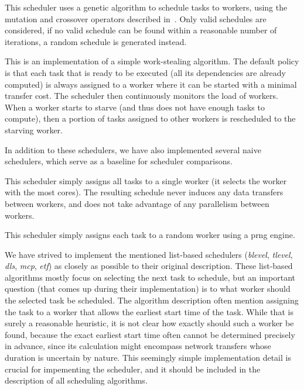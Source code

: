 \begin{description}[wide=0pt]
	\item[genetic]
		This scheduler uses a genetic algorithm to schedule tasks to workers, using the mutation and
		crossover operators described in~\cite{omara2009genetic}. Only valid schedules are considered, if no
		valid schedule can be found within a reasonable number of iterations, a random schedule is
		generated instead.

	\item[ws]
		This is an implementation of a simple work-stealing algorithm. The default policy is that each task
		that is ready to be executed (all its dependencies are already computed) is always assigned to a
		worker where it can be started with a minimal transfer cost. The scheduler then continuously
		monitors the load of workers. When a worker starts to starve (and thus does not have enough tasks
		to compute), then a portion of tasks assigned to other workers is rescheduled to the starving
		worker.
\end{description}

In addition to these schedulers, we have also implemented several naive schedulers, which serve as
a baseline for scheduler comparisons.

\begin{description}[wide=0pt]
	\item[single]
		This scheduler simply assigns all tasks to a single worker (it selects the worker with the most
		cores). The resulting schedule never induces any data transfers between workers, and does not take
		advantage of any parallelism between workers.
	\item[random]
		This scheduler simply assigns each task to a random worker using a \gls{prng} engine.
\end{description}

We have strived to implement the mentioned list-based schedulers (\emph{blevel},
\emph{tlevel}, \emph{dls}, \emph{mcp}, \emph{etf})
as closely as possible to their original description. These list-based algorithms mostly focus on
selecting the next task to schedule, but an important question (that comes up during their
implementation) is to what worker should the selected task be scheduled. The algorithm description
often mention assigning the task to a worker that allows the earliest start time of the task. While
that is surely a reasonable heuristic, it is not clear how exactly should such a worker be found,
because the exact earliest start time often cannot be determined precisely in advance, since its
calculation might encompass network transfers whose duration is uncertain by nature. This seemingly
simple implementation detail is crucial for impementing the scheduler, and it should be included in
the description of all scheduling algorithms.

